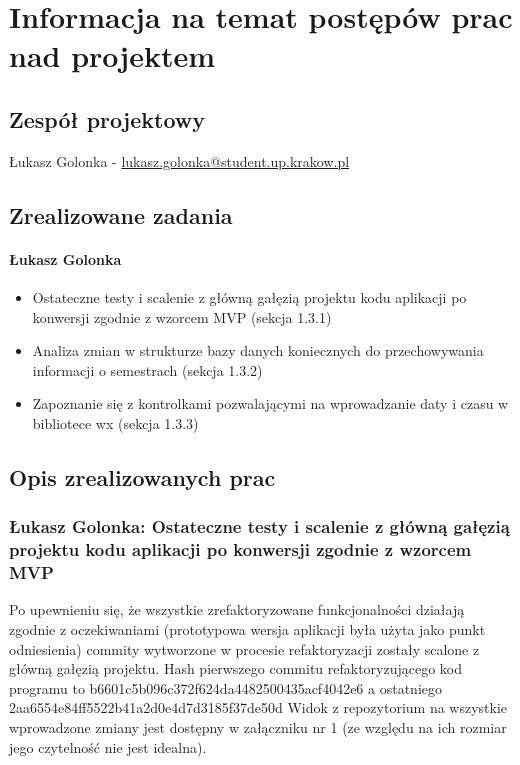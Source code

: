 \documentclass[12pt,a4paper,oneside]{article}
\theoremstyle{definition}
\numberwithin{equation}{section}
\begin{document}
\tableofcontents


\newpage

\section{Informacja na temat postępów prac nad projektem}
\subsection{Zespół projektowy}
Łukasz Golonka - \href{mailto:lukasz.golonka@student.up.krakow.pl}{lukasz.golonka@student.up.krakow.pl}
\subsection{Zrealizowane zadania}
\paragraph{Łukasz Golonka}
\begin{itemize}
\item Ostateczne testy i scalenie z główną gałęzią projektu kodu aplikacji po konwersji zgodnie z wzorcem MVP (sekcja 1.3.1)
\item Analiza zmian w strukturze bazy danych koniecznych do przechowywania informacji o semestrach (sekcja 1.3.2)
\item Zapoznanie się z kontrolkami pozwalającymi na wprowadzanie daty i czasu w bibliotece wx (sekcja 1.3.3)
\end{itemize}

\subsection {Opis zrealizowanych prac}
\subsubsection{Łukasz Golonka: Ostateczne testy i scalenie z główną gałęzią projektu kodu aplikacji po konwersji zgodnie z wzorcem MVP}
Po upewnieniu się, że wszystkie zrefaktoryzowane funkcjonalności działają zgodnie z oczekiwaniami (prototypowa wersja aplikacji była użyta jako punkt odniesienia) commity wytworzone w procesie refaktoryzacji zostały scalone z główną gałęzią projektu.
Hash pierwszego commitu refaktoryzującego kod programu to b6601c5b096c372f624da4482500435acf4042e6 a ostatniego 2aa6554e84ff5522b41a2d0e4d7d3185f37de50d
Widok z repozytorium na wszystkie wprowadzone zmiany jest dostępny w załączniku nr 1 (ze względu na ich rozmiar jego czytelność nie jest idealna).
\end{document}
